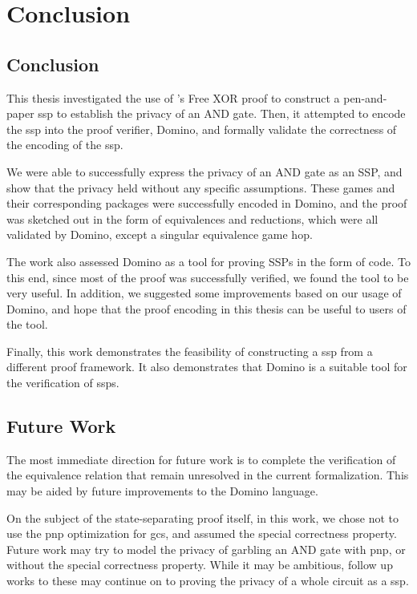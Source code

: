 \chapter{Conclusion}
\label{chp:conclusion}
\section{Conclusion}
\label{sec:conclusion}
This thesis investigated the use of \citeauthor{JC:Applebaum16}'s Free XOR proof to construct a pen-and-paper \acrshort{ssp} to establish the privacy of an AND gate. Then, it attempted to encode the \acrshort{ssp} into the proof verifier, Domino, and formally validate the correctness of the encoding of the \acrshort{ssp}. 

We were able to successfully express the privacy of an AND gate as an SSP, and show that the privacy held without any specific assumptions. These games and their corresponding packages were successfully encoded in Domino, and the proof was sketched out in the form of equivalences and reductions, which were all validated by Domino, except a singular equivalence game hop. 

The work also assessed Domino as a tool for proving SSPs in the form of code. To this end, since most of the proof was successfully verified, we found the tool to be very useful. In addition, we suggested some improvements based on our usage of Domino, and hope that the proof encoding in this thesis can be useful to users of the tool. 

Finally, this work demonstrates the feasibility of constructing a \acrlong{ssp} from a different proof framework. It also demonstrates that Domino is a suitable tool for the verification of \acrlong{ssp}s.

\section{Future Work}
\label{sec:futurework}
The most immediate direction for future work is to complete the verification of the equivalence relation that remain unresolved in the current formalization. This may be aided by future improvements to the Domino language. 

On the subject of the state-separating proof itself, in this work, we chose not to use the \acrlong{pnp} optimization for \acrlong{gc}s, and assumed the special correctness property. Future work may try to model the privacy of garbling an AND gate with \acrlong{pnp}, or without the special correctness property. 
While it may be ambitious, follow up works to these may continue on to proving the privacy of a whole circuit as a \acrlong{ssp}. 
